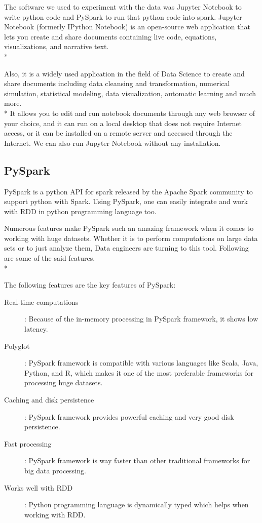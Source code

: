 The software we used to experiment with the data was Jupyter Notebook to write python code and PySpark to run that python code into spark.
Jupyter Notebook (formerly IPython Notebook) is an open-source web application that lets you create and share documents containing live code, equations, visualizations, and narrative text.\\*

Also, it is a widely used application in the field of Data Science to create and share documents including data cleansing and transformation, numerical simulation, statistical modeling, data visualization, automatic learning and much more.\\*
It allows you to edit and run notebook documents through any web browser of your choice, and it can run on a local desktop that does not require Internet access, or it can be installed on a remote server and accessed through the Internet. We can also run Jupyter Notebook without any installation.

\subsection{PySpark}
PySpark is a python API for spark released by the Apache Spark community to support python with Spark. Using PySpark, one can easily integrate and work with RDD in python programming language too. 

Numerous features make PySpark such an amazing framework when it comes to working with huge datasets. Whether it is to perform computations on large data sets or to just analyze them, Data engineers are turning to this tool. Following are some of the said features.\\*

\noindent
The following features are the key features of PySpark:

\begin{description}
	\item [Real-time computations]: Because of the in-memory processing in PySpark framework, it shows low latency.
	\item [Polyglot]: PySpark framework is compatible with various languages like Scala, Java, Python, and R, which makes it one of the most preferable frameworks for processing huge datasets.
	\item [Caching and disk persistence]: PySpark framework provides powerful caching and very good disk persistence.
	\item [Fast processing]: PySpark framework is way faster than other traditional frameworks for big data processing.
	\item [Works well with RDD]: Python programming language is dynamically typed which helps when working with RDD.
\end{description}

